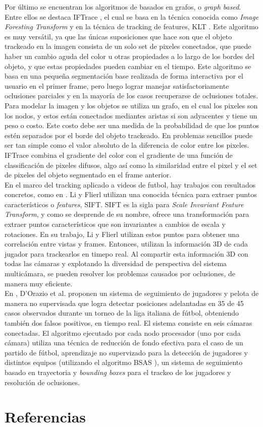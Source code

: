 \documentclass[a4paper,10pt]{article}
\begin{document}
Por último se encuentran los algoritmos de basados en grafos, o \textit{graph based}. Entre ellos se destaca IFTrace \cite{IFTrace}, el cual se basa en la técnica conocida como 
\textit{Image Foresting Transform} \cite{IFT} y en la técnica de tracking de features, KLT \cite{KLT}. Este algoritmo es muy versátil, ya que las únicas suposiciones que hace son que el objeto trackeado en la imagen consista de un
solo set de pixeles conectados, que puede haber un cambio aguda del color u otras propiedades a lo largo de los bordes del objeto, y que estas propiedades pueden cambiar en el 
tiempo. Este algoritmo se basa en una pequeña segmentación base realizada de forma interactiva por el usuario en el primer frame, pero luego lograr manejar satisfactoriamente
oclusiones parciales y en la mayoría de los casos recuperarse de oclusiones totales. Para modelar la imagen y los objetos se utiliza un grafo, en el cual los pixeles son los nodos, y
estos están conectados mediantes aristas si son adyacentes y tiene un peso o costo. Este costo debe ser una medida de la probabilidad de que los puntos estén separados por el borde del
objeto trackeado. En problemas sencillos puede ser tan simple como el valor absoluto de la diferencia de color entre los pixeles. IFTrace combina el gradiente del color con el 
gradiente de una función de classificación de pixeles difusos, algo así como la similaridad entre el pixel y el set de pixeles del objeto segmentado en el frame anterior. \\

En el marco del tracking aplicado a videos de futbol, hay trabajos
con resultados concretos, como en \cite{paper-suecia-soccer} \cite{papers-tanos}.
Li y Flierl \cite{paper-suecia-soccer} utilizan una conocida técnica para extraer
puntos característicos o \textit{features}, SIFT. SIFT es la sigla para \textit{Scale Invariant Feature Transform}, y como se 
desprende de su nombre, ofrece una transformación para extraer puntos característicos
que son invariantes a cambios de escala y rotaciones. En su trabajo, Li y Flierl utilizan estos 
puntos para obtener una correlación entre vistas y frames. Entonces, utilizan la
información 3D de cada jugador para trackearlos en timepo real. Al compartir esta información 3D con
todas las cámaras y explotando la diversidad de perspectiva del sistema multicámara,
se pueden resolver los problemas causados por oclusiones, de manera muy eficiente.\\

En \cite{papers-tanos}, D'Orazio et al. proponen un sistema de seguimiento de
jugadores y pelota de manera no supervisada que logra detectar posiciones
adelantadas en 35 de 45 casos observados durante un torneo de la liga italiana
de fútbol, obteniendo también dos falsos positivos, en tiempo real. El sistema consiste en seis
cámaras conectadas. El algoritmo ejecutado por cada nodo procesador (uno por
cada cámara) utiliza una técnica de reducción de fondo efectiva para el caso de
un partido de fútbol, aprendizaje no supervizado para la detección de jugadores
y distintos equipos (utilizando el algoritmo BSAS \cite{paper-bsas}), un
sistema de seguimiento basado en trayectoria y \textit{bounding boxes} para el
trackeo de los jugadores y resolución de oclusiones.

\section*{Referencias}
\printbibliography
\end{document}
